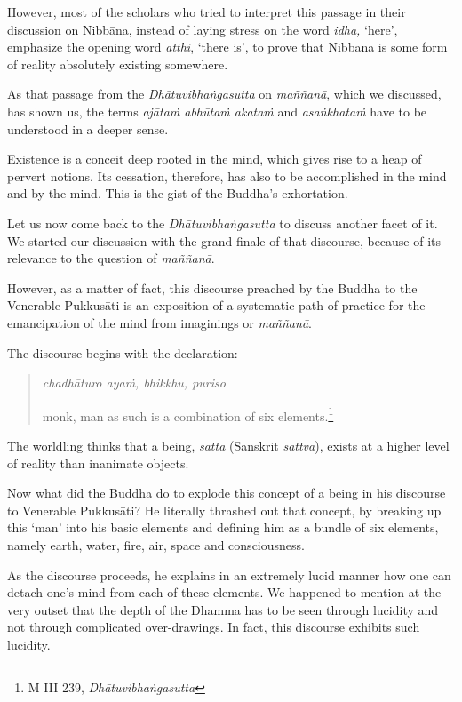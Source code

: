 However, most of the scholars who tried to interpret this passage in their discussion on Nibbāna, instead of laying stress on the word \emph{idha,} `here', emphasize the opening word \emph{atthi}, `there is', to prove that Nibbāna is some form of reality absolutely existing somewhere.

As that passage from the \emph{Dhātuvibhaṅgasutta} on \emph{maññanā}, which we discussed, has shown us, the terms \emph{ajātaṁ abhūtaṁ akataṁ} and \emph{asaṅkhataṁ} have to be understood in a deeper sense.

Existence is a conceit deep rooted in the mind, which gives rise to a heap of pervert notions. Its cessation, therefore, has also to be accomplished in the mind and by the mind. This is the gist of the Buddha's exhortation.

Let us now come back to the \emph{Dhātuvibhaṅgasutta} to discuss another facet of it. We started our discussion with the grand finale of that discourse, because of its relevance to the question of \emph{maññanā}.

However, as a matter of fact, this discourse preached by the Buddha to the Venerable Pukkusāti is an exposition of a systematic path of practice for the emancipation of the mind from imaginings or \emph{maññanā}.

The discourse begins with the declaration:

\begin{quote}
\emph{chadhāturo ayaṁ, bhikkhu, puriso}

monk, man as such is a combination of six elements.\footnote{M III 239, \emph{Dhātuvibhaṅgasutta}}
\end{quote}

The worldling thinks that a being, \emph{satta} (Sanskrit \emph{sattva}), exists at a higher level of reality than inanimate objects.

Now what did the Buddha do to explode this concept of a being in his discourse to Venerable Pukkusāti? He literally thrashed out that concept, by breaking up this `man' into his basic elements and defining him as a bundle of six elements, namely earth, water, fire, air, space and consciousness.

As the discourse proceeds, he explains in an extremely lucid manner how one can detach one's mind from each of these elements. We happened to mention at the very outset that the depth of the Dhamma has to be seen through lucidity and not through complicated over-drawings. In fact, this discourse exhibits such lucidity.

